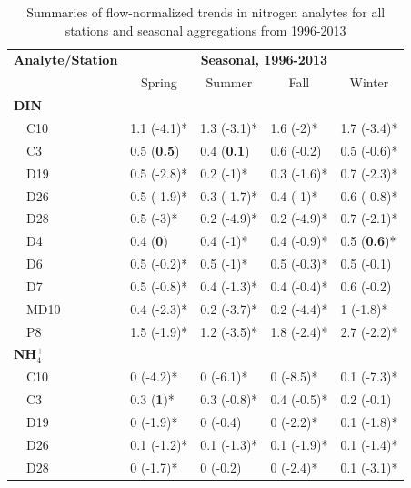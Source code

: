 \documentclass[letterpaper,12pt,oneside]{article}\usepackage[]{graphicx}\usepackage[]{color}
\begin{document}
\begin{table}[!tbp]
\caption{Summaries of flow-normalized trends in nitrogen analytes for all stations and seasonal aggregations from 1996-2013\label{tab:trndsaft}} 
\begin{center}
\begin{tabular}{lllll}
\hline\hline
\multicolumn{1}{l}{\bfseries Analyte/Station}&\multicolumn{4}{c}{\bfseries Seasonal, 1996-2013}\tabularnewline
\cline{2-5}
\multicolumn{1}{l}{}&\multicolumn{1}{c}{Spring}&\multicolumn{1}{c}{Summer}&\multicolumn{1}{c}{Fall}&\multicolumn{1}{c}{Winter}\tabularnewline
\hline
{\bfseries DIN}&&&&\tabularnewline
~~C10&1.1 \footnotesize{(-4.1)*}&1.3 \footnotesize{(-3.1)*}&1.6 \footnotesize{(-2)*}&1.7 \footnotesize{(-3.4)*}\tabularnewline
~~C3&0.5 \footnotesize{(\textbf{0.5})}&0.4 \footnotesize{(\textbf{0.1})}&0.6 \footnotesize{(-0.2)}&0.5 \footnotesize{(-0.6)*}\tabularnewline
~~D19&0.5 \footnotesize{(-2.8)*}&0.2 \footnotesize{(-1)*}&0.3 \footnotesize{(-1.6)*}&0.7 \footnotesize{(-2.3)*}\tabularnewline
~~D26&0.5 \footnotesize{(-1.9)*}&0.3 \footnotesize{(-1.7)*}&0.4 \footnotesize{(-1)*}&0.6 \footnotesize{(-0.8)*}\tabularnewline
~~D28&0.5 \footnotesize{(-3)*}&0.2 \footnotesize{(-4.9)*}&0.2 \footnotesize{(-4.9)*}&0.7 \footnotesize{(-2.1)*}\tabularnewline
~~D4&0.4 \footnotesize{(\textbf{0})}&0.4 \footnotesize{(-1)*}&0.4 \footnotesize{(-0.9)*}&0.5 \footnotesize{(\textbf{0.6})*}\tabularnewline
~~D6&0.5 \footnotesize{(-0.2)*}&0.5 \footnotesize{(-1)*}&0.5 \footnotesize{(-0.3)*}&0.5 \footnotesize{(-0.1)}\tabularnewline
~~D7&0.5 \footnotesize{(-0.8)*}&0.4 \footnotesize{(-1.3)*}&0.4 \footnotesize{(-0.4)*}&0.6 \footnotesize{(-0.2)}\tabularnewline
~~MD10&0.4 \footnotesize{(-2.3)*}&0.2 \footnotesize{(-3.7)*}&0.2 \footnotesize{(-4.4)*}&1 \footnotesize{(-1.8)*}\tabularnewline
~~P8&1.5 \footnotesize{(-1.9)*}&1.2 \footnotesize{(-3.5)*}&1.8 \footnotesize{(-2.4)*}&2.7 \footnotesize{(-2.2)*}\tabularnewline
\hline
{\bfseries NH$_{4}^{+}$}&&&&\tabularnewline
~~C10&0 \footnotesize{(-4.2)*}&0 \footnotesize{(-6.1)*}&0 \footnotesize{(-8.5)*}&0.1 \footnotesize{(-7.3)*}\tabularnewline
~~C3&0.3 \footnotesize{(\textbf{1})*}&0.3 \footnotesize{(-0.8)*}&0.4 \footnotesize{(-0.5)*}&0.2 \footnotesize{(-0.1)}\tabularnewline
~~D19&0 \footnotesize{(-1.9)*}&0 \footnotesize{(-0.4)}&0 \footnotesize{(-2.2)*}&0.1 \footnotesize{(-1.8)*}\tabularnewline
~~D26&0.1 \footnotesize{(-1.2)*}&0.1 \footnotesize{(-1.3)*}&0.1 \footnotesize{(-1.9)*}&0.1 \footnotesize{(-1.4)*}\tabularnewline
~~D28&0 \footnotesize{(-1.7)*}&0 \footnotesize{(-0.2)}&0 \footnotesize{(-2.4)*}&0.1 \footnotesize{(-3.1)*}\tabularnewline

\end{tabular}
\end{center}
\end{table}
\end{document}
